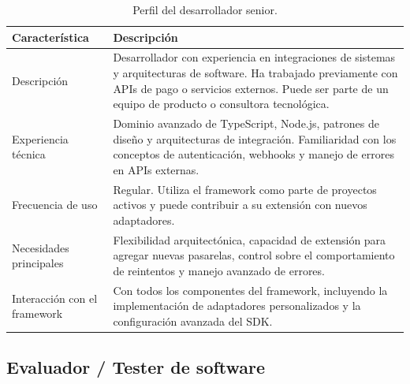 \documentclass[10pt]{article}
\begin{document}
\begin{table}[htbp]
  \centering
  \renewcommand{\arraystretch}{1.2}
  \begin{tabularx}{\textwidth}{|l|X|}
    \hline
    \textbf{Característica} & \textbf{Descripción} \\
    \hline
    Descripción & Desarrollador con experiencia en integraciones de sistemas y arquitecturas de software. Ha trabajado previamente con APIs de pago o servicios externos. Puede ser parte de un equipo de producto o consultora tecnológica. \\
    \hline
    Experiencia técnica & Dominio avanzado de TypeScript, Node.js, patrones de diseño y arquitecturas de integración. Familiaridad con los conceptos de autenticación, webhooks y manejo de errores en APIs externas. \\
    \hline
    Frecuencia de uso & Regular. Utiliza el framework como parte de proyectos activos y puede contribuir a su extensión con nuevos adaptadores. \\
    \hline
    Necesidades principales & Flexibilidad arquitectónica, capacidad de extensión para agregar nuevas pasarelas, control sobre el comportamiento de reintentos y manejo avanzado de errores. \\
    \hline
    Interacción con el framework & Con todos los componentes del framework, incluyendo la implementación de adaptadores personalizados y la configuración avanzada del SDK. \\
    \hline
  \end{tabularx}
  \caption{Perfil del desarrollador senior.}
  \label{tab:perfil-senior}
\end{table}

\subsection{Evaluador / Tester de software}
\end{document}
